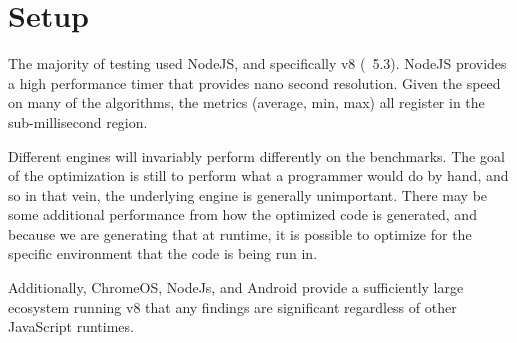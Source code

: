 \section{Setup}

The majority of testing used NodeJS, and specifically v8 (~5.3).  NodeJS provides a high performance timer that provides nano second resolution.  Given the speed on many of the algorithms, the metrics (average, min, max) all register in the sub-millisecond region.  

Different engines will invariably perform differently on the benchmarks.  The goal of the optimization is still to perform what a programmer would do by hand, and so in that vein, the underlying engine is generally unimportant.  There may be some additional performance from how the optimized code is generated, and because we are generating that at runtime, it is possible to optimize for the specific environment that the code is being run in.  

Additionally, ChromeOS, NodeJs, and Android provide a sufficiently large ecosystem running v8 that any findings are significant regardless of other JavaScript runtimes.

